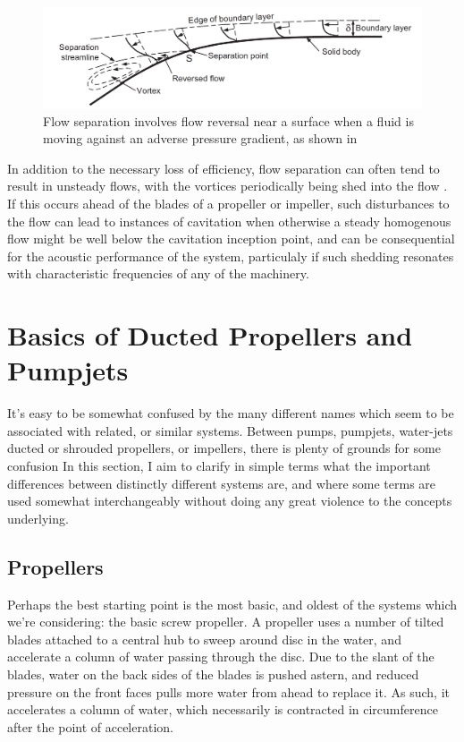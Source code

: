 \documentclass{article}\usepackage[]{graphicx}\usepackage[]{color}
\begin{document}
\begin{figure}
\includegraphics[width=\textwidth]{FlowSeparation.png}
\caption{Flow separation involves flow reversal near a surface when a fluid is moving against an adverse pressure gradient, as shown in \parencite{mollard2011}}
\label{fig:FlowSeparation.png}
\end{figure}

In addition to the necessary loss of efficiency, flow separation can often tend to result in unsteady flows, with the vortices periodically being shed into the flow \parencite[480]{mollard2011}.  If this occurs ahead of the blades of a propeller or impeller, such disturbances to the flow can lead to instances of cavitation when otherwise a steady homogenous flow might be well below the cavitation inception point, and can be consequential for the acoustic performance of the system, particulaly if such shedding resonates with characteristic frequencies of any of the machinery.

\section{Basics of Ducted Propellers and Pumpjets}
It's easy to be somewhat confused by the many different names which seem to be associated with related, or similar systems.  Between pumps, pumpjets, water-jets ducted or shrouded propellers, or impellers, there is plenty of grounds for some confusion  In this section, I aim to clarify in simple terms what the important differences between distinctly different systems are, and where some terms are used somewhat interchangeably without doing any great violence to the concepts underlying.

\subsection{Propellers}
Perhaps the best starting point is the most basic, and oldest of the systems which we're considering: the basic screw propeller.  A propeller uses a number of tilted blades attached to a central hub to sweep around disc in the water, and accelerate a column of water passing through the disc.  Due to the slant of the blades, water on the back sides of the blades is pushed astern, and reduced pressure on the front faces pulls more water from ahead to replace it.  As such, it accelerates a column of water, which necessarily is contracted in circumference after the point of acceleration.
\end{document}
